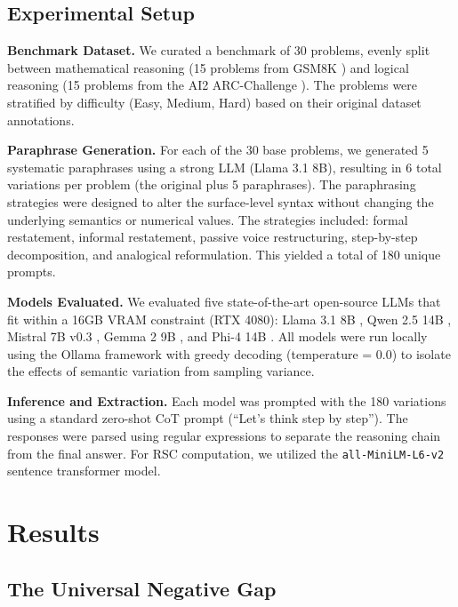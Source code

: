 \documentclass{article} %
\begin{document}
\subsection{Experimental Setup}

\textbf{Benchmark Dataset.} We curated a benchmark of 30 problems, evenly split between mathematical reasoning (15 problems from GSM8K \citep{cobbe2021training}) and logical reasoning (15 problems from the AI2 ARC-Challenge \citep{clark2018think}). The problems were stratified by difficulty (Easy, Medium, Hard) based on their original dataset annotations.

\textbf{Paraphrase Generation.} For each of the 30 base problems, we generated 5 systematic paraphrases using a strong LLM (Llama 3.1 8B), resulting in 6 total variations per problem (the original plus 5 paraphrases). The paraphrasing strategies were designed to alter the surface-level syntax without changing the underlying semantics or numerical values. The strategies included: formal restatement, informal restatement, passive voice restructuring, step-by-step decomposition, and analogical reformulation. This yielded a total of 180 unique prompts.

\textbf{Models Evaluated.} We evaluated five state-of-the-art open-source LLMs that fit within a 16GB VRAM constraint (RTX 4080): Llama 3.1 8B \citep{touvron2023llama}, Qwen 2.5 14B \citep{bai2023qwentechnicalreport}, Mistral 7B v0.3 \citep{jiang2023mistral7b}, Gemma 2 9B \citep{gemma2024}, and Phi-4 14B \citep{abdin2024phi3}. All models were run locally using the Ollama framework with greedy decoding (temperature = 0.0) to isolate the effects of semantic variation from sampling variance.

\textbf{Inference and Extraction.} Each model was prompted with the 180 variations using a standard zero-shot CoT prompt (``Let's think step by step''). The responses were parsed using regular expressions to separate the reasoning chain from the final answer. For RSC computation, we utilized the \texttt{all-MiniLM-L6-v2} sentence transformer model.

\section{Results}

\subsection{The Universal Negative Gap}
\end{document}
